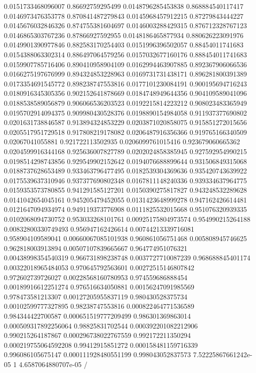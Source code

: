 \begin{table}
\begin{tabu}
\begin{sparkline}{10}
0.0151733468096007 0.86692759295499 0.0148796285453838 0.868884540117417 0.0146973476353778 0.870841487279843 0.0145968457912215 0.87279843444227 0.0145676032846326 0.874755381604697 0.0146003288429315 0.876712328767123 0.0146865303767236 0.87866927592955 0.0148186465877934 0.880626223091976 0.0149901390977846 0.882583170254403 0.0151996396502057 0.88454011741683 0.0154388063302314 0.886497064579256 0.0157032677160176 0.888454011741683 0.0159907785716406 0.890410958904109 0.0162994463907885 0.892367906066536 0.0166275197676999 0.894324853228963 0.0169731731438171 0.896281800391389 0.0173354691545772 0.898238747553816 0.0177101230084191 0.900195694716243 0.0180916345305356 0.902152641878669 0.0184748949644356 0.904109589041096 0.0188538589056879 0.906066536203523 0.0192215814223212 0.908023483365949 0.0195702914094375 0.909980430528376 0.0198890154984058 0.911937377690802 0.0201631738846587 0.913894324853229 0.0203871020858075 0.915851272015656 0.0205517951729518 0.917808219178082 0.0206487916356366 0.919765166340509 0.02067041055881 0.921722113502935 0.0206099761015416 0.923679060665362 0.0204599916344168 0.925636007827789 0.0202024858385945 0.927592954990215 0.0198514298743856 0.929549902152642 0.0194076688899644 0.931506849315068 0.0188737628653489 0.933463796477495 0.0182539304369636 0.935420743639922 0.0175539637310946 0.937377690802348 0.0167811148240336 0.939334637964775 0.0159353573780855 0.941291585127201 0.0150390275817827 0.943248532289628 0.0141042654045161 0.945205479452055 0.0131423648999278 0.947162426614481 0.0121647094934974 0.949119373776908 0.0111825532015668 0.951076320939335 0.0102068094730752 0.953033268101761 0.00925175804973574 0.954990215264188 0.00832800330749493 0.956947162426614 0.00744213339716081 0.958904109589041 0.00660067085101938 0.960861056751468 0.005808945746625 0.962818003913894 0.00507107839665667 0.964774951076321 0.00438998354540319 0.966731898238748 0.0037727710087239 0.968688845401174 0.00322018965484053 0.970645792563601 0.00272515146807842 0.972602739726027 0.00228568160780953 0.974559686888454 0.00189916612251274 0.976516634050881 0.00156247091985569 0.978473581213307 0.00127205955837119 0.980430528375734 0.00102599777327895 0.98238747553816 0.000822464771536589 0.984344422700587 0.000651519777209499 0.986301369863014 0.000509317892256064 0.98825831702544 0.000392201082212906 0.990215264187867 0.000296738022767559 0.992172211350294 0.000219755064592208 0.99412915851272 0.000158481159716339 0.996086105675147 0.000111928480551199 0.998043052837573 7.52225867661242e-05 1 4.6587064880707e-05 /
\end{sparkline}\\

\end{tabu}
\end{table}
